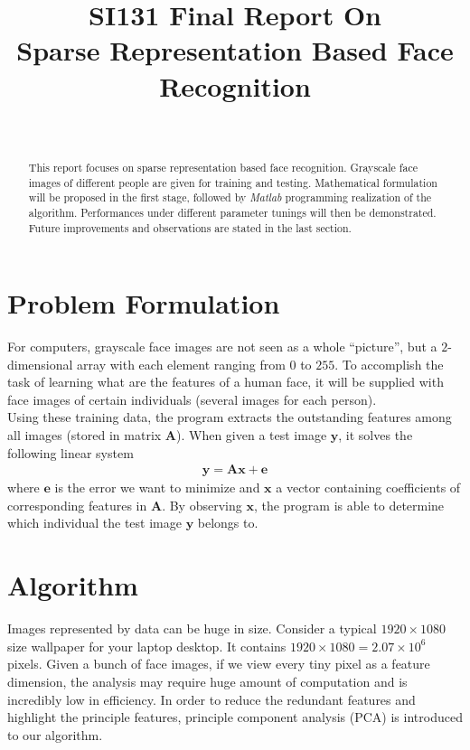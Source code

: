 \documentclass[10pt,journal]{IEEEtran}
\renewcommand{\[}{\begin{equation*} \begin{aligned}} %
\renewcommand{\]}{\end{aligned} \end{equation*}}
\begin{document}
\title{SI131 Final Report On \\Sparse Representation Based Face Recognition}
\author{\\
} 
\maketitle

\begin{abstract}
This report focuses on sparse representation based face recognition. Grayscale face images of different people are given for training and testing. Mathematical formulation will be proposed in the first stage, followed by \textit{Matlab} programming realization of the algorithm. Performances under different parameter tunings will then be demonstrated. Future improvements and observations are stated in the last section.
\end{abstract}

\section{\textbf{\large Problem Formulation}}
For computers, grayscale face images are not seen as a whole ``picture'', but a $2$-dimensional array with each element ranging from $0$ to $255$. To accomplish the task of learning what are the features of a human face, it will be supplied with face images of certain individuals (several images for each person). \\

Using these training data, the program extracts the outstanding features among all images (stored in matrix $\mathbf{A}$). When given a test image $\mathbf{y}$, it solves the following linear system
\[
	\mathbf{y = Ax +e}
\]
where $\mathbf{e}$ is the error we want to minimize and $\mathbf{x}$ a vector containing coefficients of corresponding features in $\mathbf{A}$. By observing $\mathbf{x}$, the program is able to determine which individual the test image $\mathbf{y}$ belongs to.

\section{\textbf{\large Algorithm}}
Images represented by data can be huge in size. Consider a typical $1920 \times 1080$ size wallpaper for your laptop desktop. It contains $1920 \times 1080 = 2.07 \times 10^6$ pixels. Given a bunch of face images, if we view every tiny pixel as a feature dimension, the analysis may require huge amount of computation and is incredibly low in efficiency. In order to reduce the redundant features and highlight the principle features, principle component analysis (PCA) is introduced to our algorithm. \\
\end{document}
